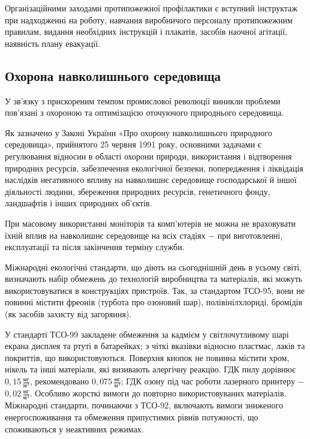 Організаційними заходами протипожежної профілактики є вступний інструктаж при надходженні на роботу, навчання виробничого персоналу протипожежним правилам, видання необхідних інструкцій і плакатів, засобів наочної агітації, наявність плану евакуації.

\vspace{1.5em}

\subsection{Охорона навколишнього середовища}

У зв’язку з прискореним темпом промислової революції виникли проблеми пов’язані з охороною та оптимізацією оточуючого природнього середовища.

Як зазначено у Законі України «Про охорону навколишнього природного середовища», прийнятого 25 червня 1991 року, основними задачами є регулювання відносин в області охорони природи, використання і відтворення природних ресурсів, забезпечення екологічної безпеки, попередження і ліквідація наслідків негативного впливу на навколишнє середовище господарської й іншої діяльності людини, збереження природних ресурсів, генетичного фонду, ландшафтів і інших природних об'єктів. 

При масовому використанні моніторів та комп’ютерів не можна не враховувати їхній вплив на навколишнє середовище на всіх стадіях $-$ при виготовленні, експлуатації та після закінчення терміну служби.

Міжнародні екологічні стандарти, що діють на сьогоднішній день в усьому світі, визначають набір обмежень до технологій виробництва та матеріалів, які можуть використовуватися в конструкціях пристроїв. Так, за стандартом ТСО-95, вони не повинні містити фреонів (турбота про озоновий шар), полівінілхлориді, бромідів (як засобів захисту від загоряння).

У стандарті ТСО-99 закладене обмеження за кадмієм у світлочутливому шарі екрана дисплея та ртуті в батарейках; э чіткі вказівки відносно пластмас, лаків та покриттів, що використовуються. Поверхня кнопок не повинна містити хром, нікель та інші матеріали, які визивають алергічну реакцію. ГДК пилу дорівнює $0,15 \, \frac{\text{мг}}{\text{м}^{3}}$, рекомендовано $0,075 \, \frac{\text{мг}}{\text{м}^{3}}$; ГДК озону під час роботи   лазерного принтеру  $-$ $0,02 \, \frac{\text{мг}}{\text{м}^{3}}$. Особливо жорсткі вимоги до повторно використовуваних матеріалів. Міжнародні стандарти, починаючи з ТСО-92, включають вимоги зниженого енергоспоживання та обмеження припустимих рівнів потужності, що споживаються у неактивних режимах.

